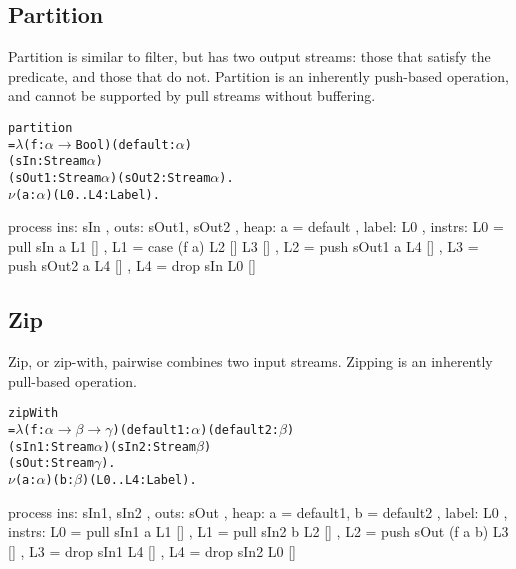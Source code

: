 \vspace{12em}
\subsection{Partition}
Partition is similar to filter, but has two output streams: those that satisfy the predicate, and those that do not. Partition is an inherently push-based operation, and cannot be supported by pull streams without buffering.
\begin{alltt}
partition 
 =  \(\lambda\) (f : \(\alpha \to\) Bool) (default : \(\alpha\))
      (sIn:   Stream \(\alpha\))
      (sOut1: Stream \(\alpha\)) (sOut2: Stream \(\alpha\)). 
    \(\nu\) (a: \(\alpha\)) (L0..L4: Label).
\end{alltt}
\begin{code}
    process
    { ins:    { sIn }
    , outs:   { sOut1, sOut2 }
    , heap:   { a = default }
    , label:  L0
    , instrs: { L0 = pull sIn   a    L1 []
              , L1 = case    (f a)   L2 []  L3 []
              , L2 = push sOut1 a    L4 []
              , L3 = push sOut2 a    L4 []
              , L4 = drop sIn        L0 [] } }
\end{code}


\subsection{Zip}
Zip, or zip-with, pairwise combines two input streams.
Zipping is an inherently pull-based operation.

\begin{alltt}
zipWith 
 =  \(\lambda\) (f : \(\alpha \to \beta \to \gamma\)) (default1 : \(\alpha\)) (default2 : \(\beta\))
      (sIn1: Stream \(\alpha\)) (sIn2: Stream \(\beta\))
      (sOut: Stream \(\gamma\)). 
    \(\nu\) (a: \(\alpha\)) (b : \(\beta\)) (L0..L4: Label).
\end{alltt}
\begin{code}
    process
    { ins:    { sIn1, sIn2 }
    , outs:   { sOut }
    , heap:   { a = default1, b = default2 }
    , label:  L0
    , instrs: { L0 = pull sIn1 a       L1 []
              , L1 = pull sIn2 b       L2 []
              , L2 = push sOut (f a b) L3 []
              , L3 = drop sIn1         L4 []
              , L4 = drop sIn2         L0 [] } }
\end{code}


